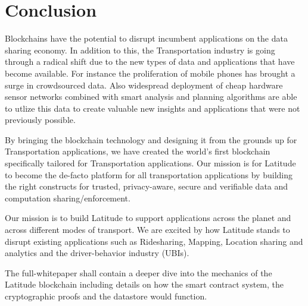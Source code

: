 \section{Conclusion}
\label{sec:conc}

Blockchains have the potential to disrupt incumbent applications on the data sharing economy. In addition to this, the
Transportation industry is going through a radical shift due to the new types of data and applications that have become
available. For instance the proliferation of mobile phones has brought a surge in crowdsourced data. Also widespread
deployment of cheap hardware sensor networks combined with smart analysis and planning algorithms are able to utlize this
data to create valuable new insights and applications that were not previously possible.

By bringing the blockchain technology and designing it from the grounds up for Transportation applications, we have created
the world's first blockchain specifically tailored for Transportation applications. Our mission is for Latitude to become
the de-facto platform for all transportation applications by building the right constructs for trusted, privacy-aware,
secure and verifiable data and computation sharing/enforcement.

Our mission is to build Latitude to support applications across the planet and across different modes of transport. We
are excited by how Latitude stands to disrupt existing applications such as Ridesharing, Mapping, Location sharing and
analytics and the driver-behavior industry (UBIs).

The full-whitepaper shall contain a deeper dive into the mechanics of the Latitude blockchain including details on how
the smart contract system, the cryptographic proofs and the datastore would function.
